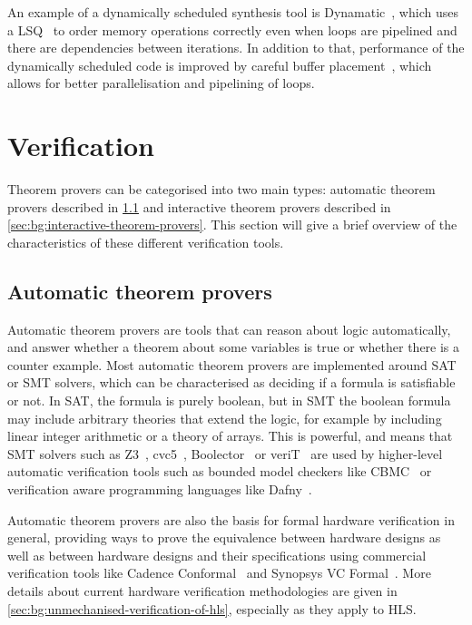 An example of a dynamically scheduled synthesis tool is
Dynamatic~\cite{josipović18_dynam_sched_high_synth}, which uses a
\gls{LSQ}~\cite{josipović17_out_order_load_store_queue_spatial_comput} to order
memory operations correctly even when loops are pipelined and there are
dependencies between iterations.  In addition to that, performance of the
dynamically scheduled code is improved by careful buffer
placement~\cite{josipović21_buffer_placem_sizin_high_perfor_dataf_circuit},
which allows for better parallelisation and pipelining of loops.

\section{Verification}%
\label{sec:bg:verification}

Theorem provers can be categorised into two main types: automatic theorem
provers described in \cref{sec:bg:automatic-theorem-provers} and interactive
theorem provers described in \cref{sec:bg:interactive-theorem-provers}.  This
section will give a brief overview of the characteristics of these different
verification tools.

\subsection{Automatic theorem provers}%
\label{sec:bg:automatic-theorem-provers}

Automatic theorem provers are tools that can reason about logic automatically,
and answer whether a theorem about some variables is true or whether there is a
counter example.  Most automatic theorem provers are implemented around
\gls{SAT} or \gls{SMT} solvers, which can be characterised as deciding if a
formula is satisfiable or not.  In \gls{SAT}, the formula is purely boolean, but
in \gls{SMT} the boolean formula may include arbitrary theories that extend the
logic, for example by including linear integer arithmetic or a theory of arrays.
This is powerful, and means that \gls{SMT} solvers such as
Z3~\cite[]{moura08_z}, cvc5~\cite[]{barbosa22_cvc5},
Boolector~\cite[]{brummayer09_b} or veriT~\cite{bouton09} are used by
higher-level automatic verification tools such as bounded model checkers like
CBMC~\cite[]{kroening14_c} or verification aware programming languages like
Dafny~\cite[]{leino10_d}.

Automatic theorem provers are also the basis for formal hardware verification in
general, providing ways to prove the equivalence between hardware designs as
well as between hardware designs and their specifications using commercial
verification tools like Cadence Conformal~\cite[]{cadence23_c} and Synopsys VC
Formal~\cite[]{synopsys23_v}.  More details about current hardware verification
methodologies are given in \cref{sec:bg:unmechanised-verification-of-hls},
especially as they apply to \gls{HLS}.

